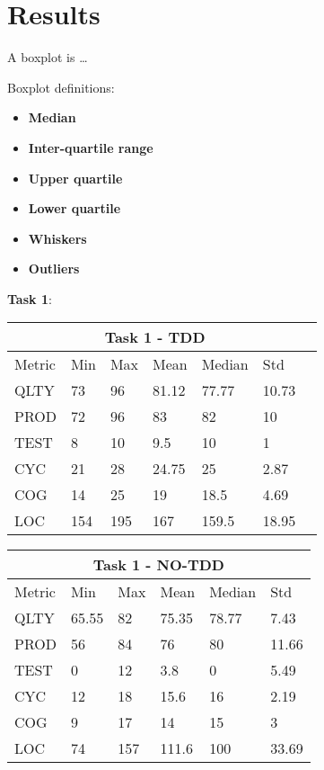 \section{Results}

A boxplot is \dots

Boxplot definitions:
\begin{itemize}
    \item \textbf{Median}
    \item \textbf{Inter-quartile range}
    \item \textbf{Upper quartile}
    \item \textbf{Lower quartile}
    \item \textbf{Whiskers}
    \item \textbf{Outliers}
\end{itemize}

\textbf{Task 1}:

\noindent
\begin{tabular}{ |p{2cm}||p{1.6cm}|p{1.6cm}|p{1.6cm}|p{1.6cm}|p{1.6cm}|p{1.6cm}| }
    \hline
        \multicolumn{6}{|c|}{Task 1 - TDD} \\
    \hline
        Metric & Min & Max & Mean & Median & Std \\
    \hline
        QLTY & 73 & 96 & 81.12 & 77.77 & 10.73 \\
        PROD & 72 & 96 & 83 & 82 & 10 \\
        TEST & 8 & 10 & 9.5 & 10 & 1 \\
        CYC & 21 & 28 & 24.75 & 25 & 2.87 \\
        COG & 14 & 25 & 19 & 18.5 & 4.69 \\
        LOC & 154 & 195 & 167 & 159.5 & 18.95 \\
    \hline
\end{tabular}

\noindent
\begin{tabular}{ |p{2cm}||p{1.6cm}|p{1.6cm}|p{1.6cm}|p{1.6cm}|p{1.6cm}|}
    \hline
        \multicolumn{6}{|c|}{Task 1 - NO-TDD} \\
    \hline
        Metric & Min & Max & Mean & Median & Std\\
    \hline
        QLTY & 65.55 & 82 & 75.35 & 78.77 & 7.43 \\
        PROD & 56 & 84 & 76 & 80 & 11.66 \\
        TEST & 0 & 12 & 3.8 & 0 & 5.49 \\
        CYC & 12 & 18 & 15.6 & 16 & 2.19 \\
        COG & 9 & 17 & 14 & 15 & 3 \\
        LOC & 74 & 157 & 111.6 & 100 & 33.69 \\
    \hline
\end{tabular}


